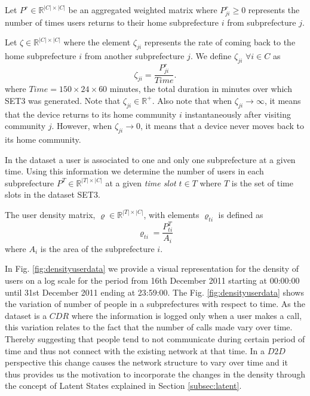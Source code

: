 \documentclass[review]{elsarticle}
\begin{document}
Let $P^r \in \mathbb{R}^{|C|\times |C|}$ be an aggregated weighted matrix where $P^{r}_{ji}\geq 0$ represents the number of times users returns to their home subprefecture $i$ from subprefecture $j$.

\begin{definition}\label{defmprrv}
Let $\zeta\in \mathbb{R}^{|C|\times|C|}$ where the element $\zeta_{ji}$ represents the rate of coming back to the home subprefecture $i$ from another subprefecture $j$. We define $\zeta_{ji}$ $\forall i \in C$ as
	\begin{equation}\label{eq:mrr}
		\displaystyle \zeta_{ji}=\frac{P^{r}_{ji}}{Time}.
	\end{equation}
where $Time=150\times24\times60$ minutes, the total duration in minutes over which SET3 was generated. Note that $\zeta_{ji}\in\mathbb{R}^+$. Also note that when $\zeta_{ji}\rightarrow \infty$, it means that the device returns to its home community $i$ instantaneously after visiting community $j$. However, when $\zeta_{ji}\rightarrow 0$, it means that a device never moves back to its home community.
\end{definition}

In the dataset a user is associated to one and only one subprefecture at a given time. Using this information we determine the number of users in each subprefecture $P^T \in \mathbb{R}^{|T|\times|C|}$ at a given \emph{time slot} $t \in T$ where $T$ is the set of time slots in the dataset SET3.
\begin{definition}\label{defdm}
The user density matrix, $\varrho\in\mathbb{R}^{|T|\times|C|}$, with elements $\varrho_{ti}$ is defined as
\begin{equation}\label{eq:dm}
\varrho_{ti}=\frac{P^{T}_{ti}}{A_{i}}
\end{equation}
where $A_{i}$ is the area of the subprefecture $i$.
\end{definition}

In Fig. \ref{fig:densityuserdata} we provide a visual representation for the density of users on a log scale for the period from 16th December 2011 starting at 00:00:00 until 31st December 2011 ending at 23:59:00. The Fig. \ref{fig:densityuserdata} shows the variation of number of people in a subprefectures with respect to time. As the dataset is a $CDR$ where the information is logged only when a user makes a call, this variation relates to the fact that the number of calls made vary over time. Thereby suggesting that people tend to not communicate during certain period of time and thus not connect with the existing network at that time. In a $D2D$ perspective this change causes the network structure to vary over time and it thus provides us the motivation to incorporate the changes in the density through the concept of Latent States explained in Section \ref{subsec:latent}.
\end{document}
